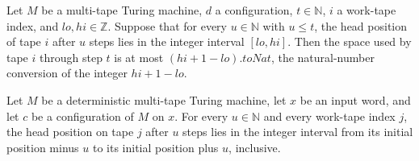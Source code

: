 \begin{theorem}
\label{Turing.MultiTapeTM.spaceUsedByTape_le_card_Icc}
\leanok
{}
Let $M$ be a multi-tape Turing machine, $d$ a configuration, $t\in\mathbb{N}$, $i$ a
work-tape index, and $lo,hi\in\mathbb{Z}$. Suppose that for every $u\in\mathbb{N}$ with
$u\le t$, the head position of tape $i$ after $u$ steps lies in the integer interval
$[lo,hi]$. Then the space used by tape $i$ through step $t$ is at most
$(hi+1-lo).toNat$, the natural-number conversion of the integer $hi+1-lo$.
\end{theorem}

\begin{theorem}
\label{Turing.MultiTapeTM.workTapePos_runFrom_mem_Icc}
\leanok
{}
Let $M$ be a deterministic multi-tape Turing machine, let $x$ be an input word, and let
$c$ be a configuration of $M$ on $x$. For every $u\in\mathbb{N}$ and every work-tape
index $j$, the head position on tape $j$ after $u$ steps lies in the integer interval
from its initial position minus $u$ to its initial position plus $u$, inclusive.
\end{theorem}
